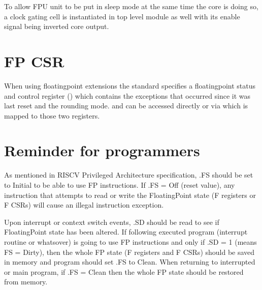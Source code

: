 \documentclass[letterpaper,10pt,english]{sphinxmanual}
\begin{document}
\sphinxAtStartPar
To allow FPU unit to be put in sleep mode at the same time the core is doing so, a clock gating cell is instantiated in  top level module as well
with its enable signal being inverted  core output.


\section{FP CSR}
\label{\detokenize{fpu:fp-csr}}
\sphinxAtStartPar
When using floating\sphinxhyphen{}point extensions the standard specifies a
floating\sphinxhyphen{}point status and control register ({\hyperref[\detokenize{control_status_registers:csr-fcsr}]{}}) which contains the
exceptions that occurred since it was last reset and the rounding mode.
{\hyperref[\detokenize{control_status_registers:csr-fflags}]{}} and {\hyperref[\detokenize{control_status_registers:csr-frm}]{}} can be accessed directly or via {\hyperref[\detokenize{control_status_registers:csr-fcsr}]{}} which is mapped to
those two registers.


\section{Reminder for programmers}
\label{\detokenize{fpu:reminder-for-programmers}}
\sphinxAtStartPar
As mentioned in RISC\sphinxhyphen{}V Privileged Architecture specification, .FS should be set to Initial to be able to use FP instructions.
If .FS = Off (reset value), any instruction that attempts to read or write the Floating\sphinxhyphen{}Point state (F registers or F CSRs) will cause an illegal instruction exception.

\sphinxAtStartPar
Upon interrupt or context switch events, .SD should be read to see if Floating\sphinxhyphen{}Point state has been altered.
If following executed program (interrupt routine or whatsover) is going to use FP instructions and only if .SD = 1 (means FS = Dirty),
then the whole FP state (F registers and F CSRs) should be saved in memory and program should set .FS to Clean.
When returning to interrupted or main program, if .FS = Clean then the whole FP state should be restored from memory.
\end{document}
